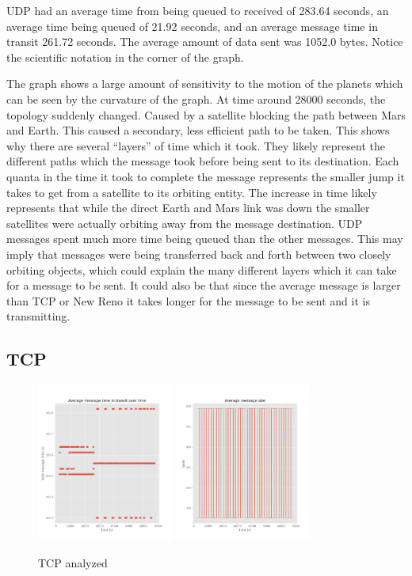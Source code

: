 \documentclass[a4paper,12pt]{article}
\begin{document}
UDP had an average time from being queued to received of 283.64 seconds, an
average time being queued of 21.92 seconds, and an average message time in
transit 261.72 seconds. The average amount of data sent was 1052.0 bytes. Notice
the scientific notation in the corner of the graph.

The graph shows a large amount of sensitivity to the motion of the planets which
can be seen by the curvature of the graph. At time around 28000 seconds, the
topology suddenly changed. Caused by a satellite blocking the path between Mars
and Earth. This caused a secondary, less efficient path to be taken. This shows
why there are several ``layers'' of time which it took. They likely represent the
different paths which the message took before being sent to its destination.
Each quanta in the time it took to complete the message represents the smaller
jump it takes to get from a satellite to its orbiting entity. The increase in
time likely represents that while the direct Earth and Mars link was down the
smaller satellites were actually orbiting away from the message destination. UDP
messages spent much more time being queued than the other messages. This may
imply that messages were being transferred back and forth between two closely
orbiting objects, which could explain the many different layers which it can
take for a message to be sent. It could also be that since the average message
is larger than TCP or New Reno it takes longer for the message to be sent and it
is transmitting.

\subsection{TCP}

\begin{figure}[h]
  \centering
  \includegraphics[width=0.4\textwidth]{media/tcp.png}
  \includegraphics[width=0.4\textwidth]{media/tcp_data.png}
  \caption{TCP analyzed}
\end{figure}
\end{document}
